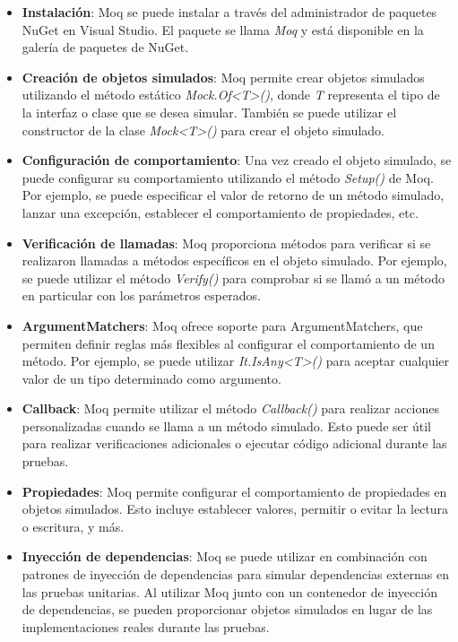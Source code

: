 \documentclass[executivepaper]{article}
\begin{document}
\begin{itemize}
    \item \textbf{Instalación}: Moq se puede instalar a través del administrador de paquetes NuGet en Visual Studio. El paquete se llama \emph{Moq} y está disponible en la galería de paquetes de NuGet.

    \item \textbf{Creación de objetos simulados}: Moq permite crear objetos simulados utilizando el método estático \emph{Mock.Of<T>()}, donde \emph{T} representa el tipo de la interfaz o clase que se desea simular. También se puede utilizar el constructor de la clase \emph{Mock<T>()} para crear el objeto simulado.

    \item \textbf{Configuración de comportamiento}: Una vez creado el objeto simulado, se puede configurar su comportamiento utilizando el método \emph{Setup()} de Moq. Por ejemplo, se puede especificar el valor de retorno de un método simulado, lanzar una excepción, establecer el comportamiento de propiedades, etc.

    \item \textbf{Verificación de llamadas}: Moq proporciona métodos para verificar si se realizaron llamadas a métodos específicos en el objeto simulado. Por ejemplo, se puede utilizar el método \emph{Verify()} para comprobar si se llamó a un método en particular con los parámetros esperados.

    \item \textbf{ArgumentMatchers}: Moq ofrece soporte para ArgumentMatchers, que permiten definir reglas más flexibles al configurar el comportamiento de un método. Por ejemplo, se puede utilizar \emph{It.IsAny<T>()} para aceptar cualquier valor de un tipo determinado como argumento.

    \item \textbf{Callback}: Moq permite utilizar el método \emph{Callback()} para realizar acciones personalizadas cuando se llama a un método simulado. Esto puede ser útil para realizar verificaciones adicionales o ejecutar código adicional durante las pruebas.

    \item \textbf{Propiedades}: Moq permite configurar el comportamiento de propiedades en objetos simulados. Esto incluye establecer valores, permitir o evitar la lectura o escritura, y más.

    \item \textbf{Inyección de dependencias}: Moq se puede utilizar en combinación con patrones de inyección de dependencias para simular dependencias externas en las pruebas unitarias. Al utilizar Moq junto con un contenedor de inyección de dependencias, se pueden proporcionar objetos simulados en lugar de las implementaciones reales durante las pruebas.
\end{itemize}
\end{document}
